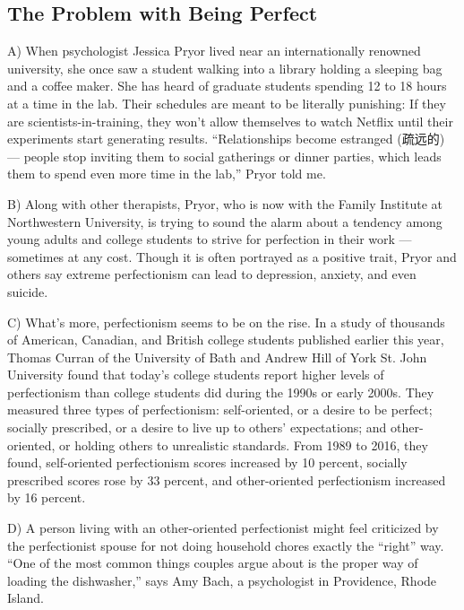 \documentclass[UTF8,11pt]{ctexart}
\begin{document}
\subsection*{\textbf{The Problem with Being Perfect}}


A) When psychologist Jessica Pryor lived near an internationally renowned university, she once saw a student walking into a library holding a sleeping bag and a coffee maker. She has heard of graduate students spending 12 to 18 hours at a time in the lab. Their schedules are meant to be literally punishing: If they are scientists-in-training, they won’t allow themselves to watch Netflix until their experiments start generating results. “Relationships become estranged (疏远的) — people stop inviting them to social gatherings or dinner parties, which leads them to spend even more time in the lab,” Pryor told me.


B) Along with other therapists, Pryor, who is now with the Family Institute at Northwestern University, is trying to sound the alarm about a tendency among young adults and college students to strive for perfection in their work — sometimes at any cost. Though it is often portrayed as a positive trait, Pryor and others say extreme perfectionism can lead to depression, anxiety, and even suicide.


C) What’s more, perfectionism seems to be on the rise. In a study of thousands of American, Canadian, and British college students published earlier this year, Thomas Curran of the University of Bath and Andrew Hill of York St. John University found that today’s college students report higher levels of perfectionism than college students did during the 1990s or early 2000s. They measured three types of perfectionism: self-oriented, or a desire to be perfect; socially prescribed, or a desire to live up to others’ expectations; and other-oriented, or holding others to unrealistic standards. From 1989 to 2016, they found, self-oriented perfectionism scores increased by 10 percent, socially prescribed scores rose by 33 percent, and other-oriented perfectionism increased by 16 percent.


D) A person living with an other-oriented perfectionist might feel criticized by the perfectionist spouse for not doing household chores exactly the “right” way. “One of the most common things couples argue about is the proper way of loading the dishwasher,” says Amy Bach, a psychologist in Providence, Rhode Island.
\end{document}
